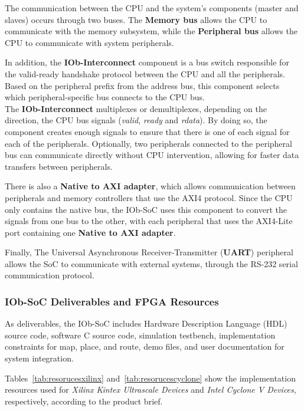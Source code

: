 The communication between the CPU and the system’s components (master and slaves) occurs through two buses. The \textbf{Memory bus} allows the CPU to communicate with the memory subsystem, while the \textbf{Peripheral bus} allows the CPU to communicate with system peripherals.

In addition, the \textbf{IOb-Interconnect} component is a bus switch responsible for the valid-ready handshake protocol between the CPU and all the peripherals. Based on the peripheral prefix from the address bus, this component selects which peripheral-specific bus connects to the CPU bus. \\
The \textbf{IOb-Interconnect} multiplexes or demultiplexes, depending on the direction, the CPU bus signals (\textit{valid}, \textit{ready} and \textit{rdata}). By doing so, the component creates enough signals to ensure that there is one of each signal for each of the peripherals. Optionally, two peripherals connected to the peripheral bus can communicate directly without CPU intervention, allowing for faster data transfers between peripherals.

There is also a \textbf{Native to AXI adapter}, which allows communication between peripherals and memory controllers that use the AXI4 protocol. Since the CPU only contains the native bus, the IOb-SoC uses this component to convert the signals from one bus to the other, with each peripheral that uses the AXI4-Lite port containing one \textbf{Native to AXI adapter}.

Finally, The Universal Asynchronous Receiver-Transmitter (\textbf{\textbf{UART}}) peripheral allows the SoC to communicate with external systems, through the RS-232 serial communication protocol. 

\subsubsection{IOb-SoC Deliverables and FPGA Resources}
As deliverables, the IOb-SoC includes Hardware Description Language (HDL) source code, software C source code, simulation testbench, implementation constraints for map, place, and route, demo files, and user documentation for system integration.

Tables~\ref{tab:resorucesxilinx} and~\ref{tab:resorucescyclone} show the implementation resources used for \textit{Xilinx Kintex Ultrascale Devices} and \textit{Intel Cyclone V Devices}, respectively, according to the product brief.

\vspace{0.8cm}

